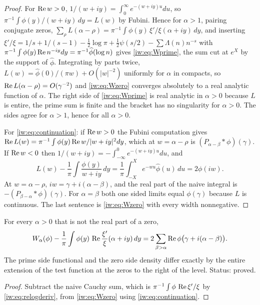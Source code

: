 \begin{proof}
For $\operatorname{Re} w>0$, $1/(w+iy)=\int_0^\infty e^{-(w+iy)u}du$, so $\pi^{-1}\int\phi(y)/(w+iy)\,dy=L(w)$ by Fubini. Hence for $\alpha>1$, pairing conjugate zeros, $\sum_\rho L(\alpha-\rho)=\pi^{-1}\int\phi(y)\,\xi'/\xi(\alpha+iy)\,dy$, and inserting $\xi'/\xi=1/s+1/(s-1)-\frac12\log\pi+\frac12\psi(s/2)-\sum\Lambda(n)n^{-s}$ with $\pi^{-1}\int\phi(y)\operatorname{Re} n^{-iy}dy=\pi^{-1}\widehat\phi(\log n)$ gives \eqref{iw:eq:Wprime}, the sum cut at $e^X$ by the support of $\widehat\phi$. Integrating by parts twice, $L(w)=\widehat\phi(0)/(\pi w)+O(|w|^{-2})$ uniformly for $\alpha$ in compacts, so $\operatorname{Re} L(\alpha-\rho)=O(\gamma^{-2})$ and \eqref{iw:eq:Wzero} converges absolutely to a real analytic function of $\alpha$. The right side of \eqref{iw:eq:Wprime} is real analytic in $\alpha>0$ because $L$ is entire, the prime sum is finite and the bracket has no singularity for $\alpha>0$. The sides agree for $\alpha>1$, hence for all $\alpha>0$.

For \eqref{iw:eq:continuation}: if $\operatorname{Re} w>0$ the Fubini computation gives $\operatorname{Re} L(w)=\pi^{-1}\int\phi(y)\operatorname{Re} w/|w+iy|^2dy$, which at $w=\alpha-\rho$ is $(P_{\alpha-\beta}*\phi)(\gamma)$. If $\operatorname{Re} w<0$ then $1/(w+iy)=-\int_{-\infty}^0e^{-(w+iy)u}du$, and
\[
L(w)-\frac1\pi\int\frac{\phi(y)}{w+iy}\,dy=\frac1\pi\int_{-X}^Xe^{-wu}\widehat\phi(u)\,du=2\phi(iw).
\]
At $w=\alpha-\rho$, $iw=\gamma+i(\alpha-\beta)$, and the real part of the naive integral is $-(P_{\beta-\alpha}*\phi)(\gamma)$. For $\alpha=\beta$ both one sided limits equal $\phi(\gamma)$ because $L$ is continuous. The last sentence is \eqref{iw:eq:Wzero} with every width nonnegative.
\end{proof}

\begin{corollary}\label{iw:cor:residue}
For every $\alpha>0$ that is not the real part of a zero,
\[
W_\alpha(\phi)-\frac1\pi\int\phi(y)\,\operatorname{Re}\frac{\xi'}\xi(\alpha+iy)\,dy=2\sum_{\beta>\alpha}\operatorname{Re}\phi\big(\gamma+i(\alpha-\beta)\big).
\]
The prime side functional and the zero side density differ exactly by the entire extension of the test function at the zeros to the right of the level. Status: proved.
\end{corollary}

\begin{proof}
Subtract the naive Cauchy sum, which is $\pi^{-1}\int\phi\,\operatorname{Re}\xi'/\xi$ by \eqref{iw:eq:relogderiv}, from \eqref{iw:eq:Wzero} using \eqref{iw:eq:continuation}.
\end{proof}


